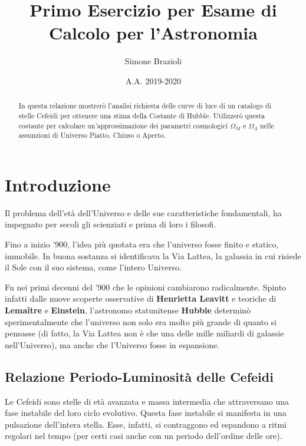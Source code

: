 \documentclass{article}
\begin{document}
\author{Simone Brazioli}
\title{Primo Esercizio per Esame di Calcolo per l'Astronomia}
\date{A.A. 2019-2020}

\maketitle
\begin{abstract}
In questa relazione mostrerò l'analisi richiesta delle curve di luce
di un catalogo di stelle Cefeidi per ottenere una stima della Costante
di Hubble. Utilizzerò questa costante per calcolare un'approssimazione
dei parametri cosmologici $\Omega_M$ e $\Omega_\Lambda$ nelle
assunzioni di Universo Piatto, Chiuso o Aperto.
\end{abstract}

\tableofcontents
\clearpage

\section{Introduzione}
Il problema dell'età dell'Universo e delle sue caratteristiche
fondamentali, ha impegnato per secoli gli scienziati e prima di loro i
filosofi.

Fino a inizio '900, l'idea più quotata era che l'universo fosse finito
e statico, immobile. In buona sostanza si identificava la Via Lattea,
la galassia in cui risiede il Sole con il suo sistema, come l'intero
Universo.

Fu nei primi decenni del '900 che le opinioni cambiarono
radicalmente. Spinto infatti dalle nuove scoperte osservative di
\textbf{Henrietta Leavitt} e teoriche di \textbf{Lemaître} e
\textbf{Einstein}, l'astronomo statunitense \textbf{Hubble} determinò
sperimentalmente che l'universo non solo era molto più grande di
quanto si pensasse (di fatto, la Via Lattea non è che una delle mille
miliardi di galassie nell'Universo), ma anche che l'Universo fosse in
espansione.

\subsection{Relazione Periodo-Luminosità delle Cefeidi}
Le Cefeidi sono stelle di età avanzata e massa intermedia che
attraversano una fase instabile del loro ciclo evolutivo. Questa fase
instabile si manifesta in una pulsazione dell'intera stella. Esse,
infatti, si contraggono ed espandono a ritmi regolari nel tempo (per
certi casi anche con un periodo dell'ordine delle ore).
\end{document}
